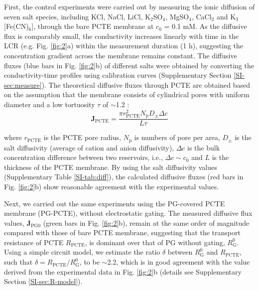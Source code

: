 \documentclass[journal=langd5,email=true, hyperref=true, keywords=false]{achemso}
\newcommand{\Fig}{Fig.}
\begin{document}
First, the control experiments were carried out by measuring the ionic
diffusion of seven salt species, including KCl, NaCl, LiCl,
K$_{2}$SO$_{4}$, MgSO$_{4}$, CaCl$_{2}$ and K$_{3}$[Fe(CN)$_{6}$],
through the bare PCTE membrane at $c_{0}$ = 0.1 mM. As the diffusive
flux is comparably small, the conductivity increases linearly with
time in the LCR (e.g. \Fig{} \ref{fig:2}a) within the measurement
duration (1 h), suggesting the concentration gradient across the
membrane remains constant. The diffusive fluxes (blue bars in \Fig{}
\ref{fig:2}b) of different salts were obtained by converting the
conductivity-time profiles using calibration curves (Supplementary
Section \ref{SI-sec:measure}). The theoretical diffusive fluxes
through PCTE are obtained based on the assumption that the membrane
consists of cylindrical pores with uniform diameter and a low
tortuosity $\tau$ of $\sim{}$1.2 \cite{O_Hern_2012}:
\begin{equation}
  \label{eq:j-pcte}
  \boldsymbol{J}_{\mathrm{PCTE}} = \frac{\pi r_{\mathrm{PCTE}}^{2} N_{\mathrm{p}} D_{\mathrm{\pm}} \Delta c}{L \tau}
\end{equation}

where $r_{\mathrm{PCTE}}$ is the PCTE pore radius, $N_{\mathrm{p}}$ is
numbers of pore per area, $D_{\mathrm{\pm}}$ is the salt diffusivity
(average of cation and anion diffusivity), $\Delta c$ is the bulk
concentration difference between two reservoirs, i.e.,
$\Delta c \sim c_{0}$ and $L$ is the thickness of the PCTE membrane.
By using the salt diffusivity values (Supplementary Table
\ref{SI-tab:diff}), the calculated diffusive fluxes (red bars in
\Fig{} \ref{fig:2}b) show reasonable agreement with the experimental
values.

Next, we carried out the same experiments using the PG-covered PCTE
membrane (PG-PCTE), without electrostatic gating. The measured
diffusive flux values, $\boldsymbol{J}_{\mathrm{PG0}}$ (green bars in
\Fig{} \ref{fig:2}b), remain at the same order of magnitude compared
with those of bare PCTE membrane, suggesting that the transport
resistance of PCTE $R_{\mathrm{PCTE}}$, is dominant over that of PG
without gating, $R_{\mathrm{G}}^{0}$. Using a simple circuit model, we
estimate the ratio $\delta$ between $R_{\mathrm{G}}^{0}$ and
$R_{\mathrm{PCTE}}$, such that
$\delta = R_{\mathrm{PCTE}}/R_{\mathrm{G}}^{0}$, to be $\sim$2.2,
which is in good agreement with the value derived from the
experimental data in \Fig{} \ref{fig:2}b (details see Supplementary
Section \ref{SI-sec:R-model}).
\end{document}
